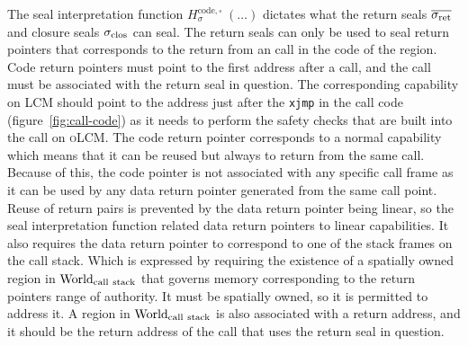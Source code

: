 \documentclass[acmsmall,review,anonymous]{acmart}\settopmatter{printfolios=true,printccs=false,printacmref=false}
\renewcommand{\Worlds}{\World_{\mathrm{call\ stack}}}
\newcommand{\trgcm}{\textsc{LCM}}
\newcommand{\srccm}{\textsc{oLCM}}
\begin{document}
The seal interpretation function $H^\mathrm{code,\square}_\sigma \; (\dots)$ dictates what the return seals $\sigrets$ and closure seals $\sigclos$ can seal.
The return seals can only be used to seal return pointers that corresponds to the return from an call in the code of the region.
Code return pointers must point to the first address after a call, and the call must be associated with the return seal in question.
The corresponding capability on \trgcm{} should point to the address just after the \texttt{xjmp} in the call code (figure~\ref{fig:call-code}) as it needs to perform the safety checks that are built into the call on \srccm{}.
The code return pointer corresponds to a normal capability which means that it can be reused but always to return from the same call.
Because of this, the code pointer is not associated with any specific call frame as it can be used by any data return pointer generated from the same call point.
Reuse of return pairs is prevented by the data return pointer being linear, so the seal interpretation function related data return pointers to linear capabilities.
It also requires the data return pointer to correspond to one of the stack frames on the call stack.
Which is expressed by requiring the existence of a spatially owned region in $\Worlds$ that governs memory corresponding to the return pointers range of authority.
It must be spatially owned, so it is permitted to address it.
A region in $\Worlds$ is also associated with a return address, and it should be the return address of the call that uses the return seal in question.
\end{document}
